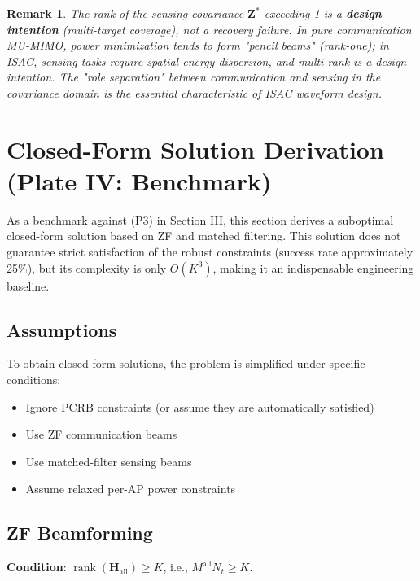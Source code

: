 \documentclass[12pt,a4paper]{article}
\newtheorem{remark}{Remark}
\newcommand{\mat}[1]{\mathbf{#1}}
\DeclareMathOperator{\rank}{rank}
\begin{document}
\begin{remark}
The rank of the sensing covariance $\mat{Z}^*$ exceeding 1 is a \textbf{design intention} (multi-target coverage), not a recovery failure. In pure communication MU-MIMO, power minimization tends to form "pencil beams" (rank-one); in ISAC, sensing tasks require spatial energy dispersion, and multi-rank is a design intention. The "role separation" between communication and sensing in the covariance domain is the essential characteristic of ISAC waveform design.
\end{remark}

\section{Closed-Form Solution Derivation (Plate IV: Benchmark)}

As a benchmark against (P3) in Section III, this section derives a suboptimal closed-form solution based on ZF and matched filtering. This solution does not guarantee strict satisfaction of the robust constraints (success rate approximately 25\%), but its complexity is only $O(K^3)$, making it an indispensable engineering baseline.

\subsection{Assumptions}

To obtain closed-form solutions, the problem is simplified under specific conditions:
\begin{itemize}
    \item Ignore PCRB constraints (or assume they are automatically satisfied)
    \item Use ZF communication beams
    \item Use matched-filter sensing beams
    \item Assume relaxed per-AP power constraints
\end{itemize}

\subsection{ZF Beamforming}

\textbf{Condition}: $\rank(\mat{H}_{\text{all}}) \geq K$, i.e., $M^{\text{all}} N_t \geq K$.
\end{document}
